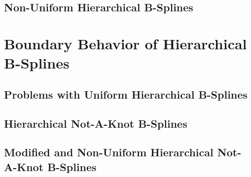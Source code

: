 
\subsection{Non-Uniform Hierarchical B-Splines}


\section{Boundary Behavior of Hierarchical B-Splines}


\subsection{Problems with Uniform Hierarchical B-Splines}


\subsection{Hierarchical Not-A-Knot B-Splines}


\subsection{Modified and Non-Uniform Hierarchical Not-A-Knot B-Splines}


\blindmathpaper
